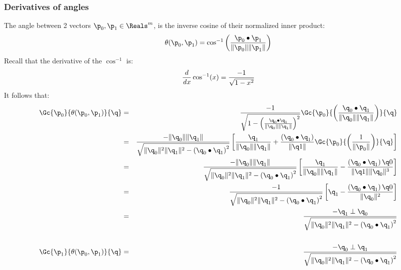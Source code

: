 
\subsubsection{Derivatives of angles}
\label{sec:derivatives-of-angles}

The angle between 2 vectors $\p_0, \p_1 \in \Reals^m$, is the inverse cosine
of their normalized inner product:
\begin{equation}
\theta(\p_0,\p_1)
=
\cos^{-1}
\left(
{ \p_0 \bullet \p_1 } \over {\|\p_0\| \|\p_1\|}
\right)
\end{equation}
Recall that the derivative of the $\cos^{-1}$ is:
\begin{equation}
\frac{d}{\mathit dx} \cos^{-1}(x) = { -1 \over \sqrt{1 - x^2} }
\end{equation}
It follows that:
\begin{eqnarray}
\label{eq:angle_gradient}
\Gc{\p_0}{\theta(\p_0,\p_1)}{\q}
& = &
{{-1} \over
{ \sqrt{1 - \left( {\q_0 \bullet \q_1} \over {\| \q_0 \| \| \q_1 \|} \right)^2 }}}
\Gc{\p_0}{\left( {\q_0 \bullet \q_1} \over {\| \q_0 \| \| \q_1 \|} \right)} {\q}
\\
& = &
{
{-\|\q_0\|\|\q_1\|}
\over
{ \sqrt{\|\q_0\|^2\|\q_1\|^2 - \left( \q_0 \bullet \q_1 \right)^2 }}
}
\left[
{{\q_1} \over {\|\q_0\|\|\q_1\|}}
+
{{\left( \q_0 \bullet \q_1 \right)} \over {\| \q1 \|}}
\Gc{\p_0}{\left( {1} \over {\| \p_0 \|} \right)} {\q}
\right]
\nonumber
\\
& = &
{
{-\|\q_0\|\|\q_1\|}
\over
{ \sqrt{\|\q_0\|^2\|\q_1\|^2 - \left( \q_0 \bullet \q_1 \right)^2 }}
}
\left[
{{\q_1} \over {\|\q_0\|\|\q_1\|}}
-
{{\left( \q_0 \bullet \q_1 \right) \q0} \over {\| \q1 \| \|\q_0\|^3}}
\right]
\nonumber
\\
& = &
{
{-1}
\over
{ \sqrt{\|\q_0\|^2\|\q_1\|^2 - \left( \q_0 \bullet \q_1 \right)^2 }}
}
\left[
\q_1
-
{{\left( \q_0 \bullet \q_1 \right) \q0} \over {\|\q_0\|^2}}
\right]
\nonumber
\\
& = &
{
{- \q_1 \perp \q_0}
\over
{ \sqrt{\|\q_0\|^2\|\q_1\|^2 - \left( \q_0 \bullet \q_1 \right)^2 }}
}
\nonumber
\\
&  &
\nonumber
\\
\Gc{\p_1}{\theta(\p_0,\p_1)}{\q}
& = &
{
{- \q_0 \perp \q_1}
\over
{ \sqrt{\|\q_0\|^2\|\q_1\|^2 - \left( \q_0 \bullet \q_1 \right)^2 }}
}
\nonumber
\end{eqnarray}